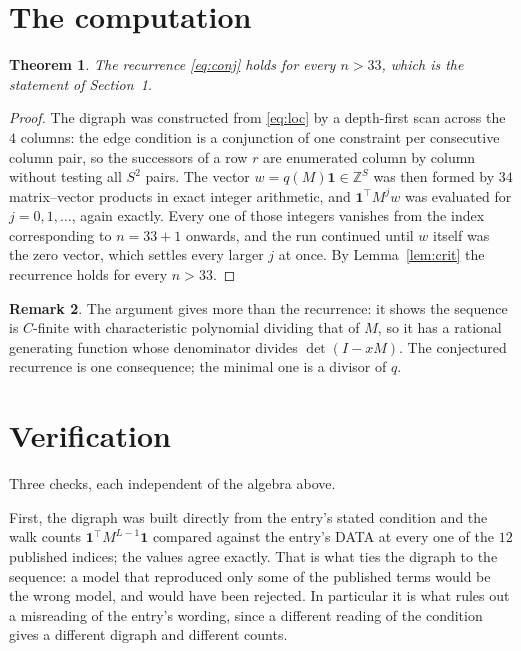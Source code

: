 \documentclass[11pt,a4paper]{article}
\theoremstyle{plain}
\newtheorem{theorem}{Theorem}
\theoremstyle{definition}
\newtheorem{remark}[theorem]{Remark}
\begin{document}
\section{The computation}

\begin{theorem}
The recurrence \eqref{eq:conj} holds for every $n>33$, which is the statement of
Section~1.
\end{theorem}

\begin{proof}
The digraph was constructed from \eqref{eq:loc} by a depth-first scan across the $4$
columns: the edge condition is a conjunction of one constraint per consecutive column
pair, so the successors of a row $r$ are enumerated column by column without testing all
$S^2$ pairs. The vector $w=q(M)\mathbf{1}\in\mathbb{Z}^{S}$ was then formed by $34$
matrix--vector products in exact integer arithmetic, and $\mathbf{1}^{\!\top}M^{j}w$ was
evaluated for $j=0,1,\dots$, again exactly. Every one of those integers vanishes from the
index corresponding to $n=33+1$ onwards, and the run continued until $w$ itself was the
zero vector, which settles every larger $j$ at once. By Lemma~\ref{lem:crit} the recurrence
holds for every $n>33$.
\end{proof}

\begin{remark}
The argument gives more than the recurrence: it shows the sequence is $C$-finite with
characteristic polynomial dividing that of $M$, so it has a rational generating function
whose denominator divides $\det(I-xM)$. The conjectured recurrence is one consequence; the
minimal one is a divisor of $q$.
\end{remark}

\section{Verification}

Three checks, each independent of the algebra above.

First, the digraph was built directly from the entry's stated condition and the walk counts
$\mathbf{1}^{\!\top}M^{L-1}\mathbf{1}$ compared against the entry's DATA at
every one of the $12$ published indices; the values agree exactly. That is what ties
the digraph to the sequence: a model that reproduced only some of the published terms would
be the wrong model, and would have been rejected. In particular it is what rules out a
misreading of the entry's wording, since a different reading of the condition gives a
different digraph and different counts.
\end{document}
